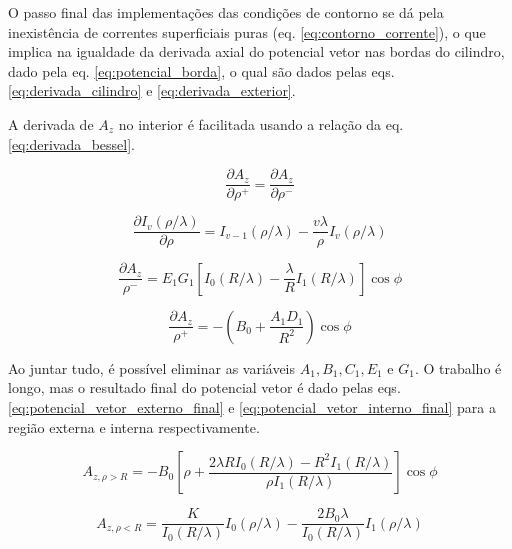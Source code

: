 \documentclass[%
 reprint,
 amsmath,amssymb,
 aps,
]{revtex4-1}
\begin{document}
O passo final das implementações das condições de contorno se dá pela inexistência de correntes superficiais puras (eq. \ref{eq:contorno_corrente}), o que implica na igualdade da derivada axial do potencial vetor nas bordas do cilindro, dado pela eq. \ref{eq:potencial_borda}, o qual são dados pelas eqs. \ref{eq:derivada_cilindro} e \ref{eq:derivada_exterior}.

A derivada de $A_z$ no interior é facilitada usando a relação da eq. \ref{eq:derivada_bessel}. \cite{original_article}

\begin{equation}
    \label{eq:potencial_borda}
    \frac{\partial A_z}{\partial \rho^+} = \frac{\partial A_z}{\partial \rho^-}
\end{equation}

\begin{equation}
    \label{eq:derivada_bessel}
    \frac{\partial I_v(\rho / \lambda)}{\partial \rho} = I_{v-1}(\rho / \lambda) - \frac{v \lambda}{\rho} I_v(\rho / \lambda)
\end{equation}

\begin{equation}
    \label{eq:derivada_cilindro}
    \frac{\partial A_z}{\rho^-} = E_1 G_1 [I_0(R/\lambda) - \frac{\lambda}{R}I_1(R/\lambda)] \cos{\phi}
\end{equation}

\begin{equation}
    \label{eq:derivada_exterior}
    \frac{\partial A_z}{\rho^+} = -(B_0 + \frac{A_1 D_1}{R^2})\cos{\phi} 
\end{equation}

Ao juntar tudo, é possível eliminar as variáveis $A_1, B_1, C_1, E_1 \mbox{ e } G_1$. O trabalho é longo, mas o resultado final do potencial vetor é dado pelas eqs. \ref{eq:potencial_vetor_externo_final} e \ref{eq:potencial_vetor_interno_final} para a região externa e interna respectivamente.

\begin{equation}
    \label{eq:potencial_vetor_externo_final}
    A_{z, \rho > R} = -B_0 [\rho + \frac{2 \lambda R I_0(R/\lambda) - R^2 I_1(R/\lambda)}{\rho I_1(R/\lambda)}] \cos{\phi}
\end{equation}

\begin{equation}
    \label{eq:potencial_vetor_interno_final}
    A_{z, \rho < R} = \frac{K}{I_0 (R / \lambda)} I_0(\rho / \lambda) - \frac{2 B_0 \lambda}{I_0(R/\lambda)} I_1(\rho / \lambda)
\end{equation}
\end{document}
